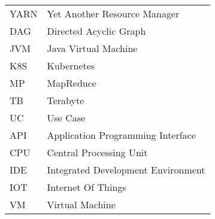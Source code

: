 \begin{longtable}{p{3cm}p{10cm}}
    YARN&Yet Another Resource Manager\\
    DAG&Directed Acyclic Graph \\
    JVM&Java Virtual Machine\\
    K8S&Kubernetes\\
    MP&MapReduce \\
    TB&Terabyte\\
    UC&Use Case\\
API&Application Programming Interface\\
CPU&Central Processing Unit\\
IDE&Integrated Development Environment\\
IOT&Internet Of Things\\
VM&Virtual Machine\\
\end{longtable}
\addtocounter{table}{-1} 